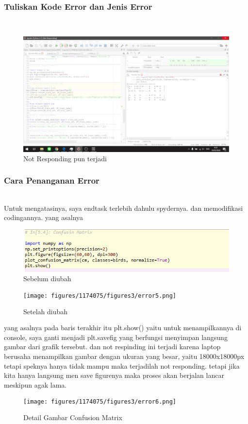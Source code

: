 \subsubsection{Tuliskan Kode Error dan Jenis Error}
\hfill\\
\begin{figure}[H]
	\centering
	\includegraphics[width=12cm]{figures/1174075/3/error3.png}
	\caption{Not Responding pun terjadi}
\end{figure}

\subsubsection{Cara Penanganan Error}
\hfill\\
Untuk mengatasinya, saya endtask terlebih dahulu spydernya. dan memodifikasi codingannya. yang asalnya
\begin{figure}[H]
	\centering
	\includegraphics[width=12cm]{figures/1174075/3/error4.png}
	\caption{Sebelum diubah}
\end{figure}

\begin{figure}[H]
	\centering
	\texttt{[image: figures/1174075/figures3/error5.png]}
	\caption{Setelah diubah}
\end{figure}
yang asalnya pada baris terakhir itu plt.show() yaitu untuk menampilkannya di console, saya ganti menjadi plt.savefig yang berfungsi menyimpan langsung gambar dari grafik tersebut. dan not respinding ini terjadi karena laptop berusaha menampilkan gambar dengan ukuran yang besar, yaitu 18000x18000px tetapi speknya hanya tidak mampu maka terjadilah not responding. tetapi jika kita hanya langsung men save figurenya maka proses akan berjalan lancar meskipun agak lama.
\begin{figure}[H]
	\centering
	\texttt{[image: figures/1174075/figures3/error6.png]}
	\caption{Detail Gambar Confusion Matrix}
\end{figure}
\hfill\\

